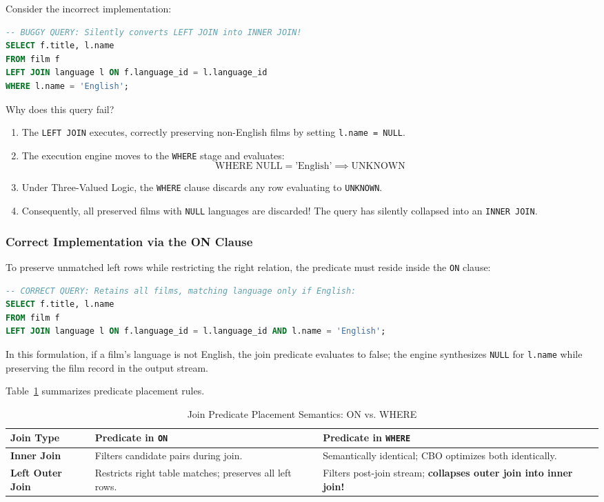 \documentclass[10pt,twocolumn,letterpaper]{article}
\begin{document}
Consider the incorrect implementation:
\begin{lstlisting}[language=SQL]
-- BUGGY QUERY: Silently converts LEFT JOIN into INNER JOIN!
SELECT f.title, l.name
FROM film f
LEFT JOIN language l ON f.language_id = l.language_id
WHERE l.name = 'English';
\end{lstlisting}
Why does this query fail?
\begin{enumerate}
    \item The \texttt{LEFT JOIN} executes, correctly preserving non-English films by setting \texttt{l.name = NULL}.
    \item The execution engine moves to the \texttt{WHERE} stage and evaluates:
    \begin{equation*}
    \text{WHERE } \text{NULL} = \text{'English'} \implies \text{UNKNOWN}
    \end{equation*}
    \item Under Three-Valued Logic, the \texttt{WHERE} clause discards any row evaluating to \texttt{UNKNOWN}.
    \item Consequently, all preserved films with \texttt{NULL} languages are discarded! The query has silently collapsed into an \texttt{INNER JOIN}.
\end{enumerate}

\subsubsection{Correct Implementation via the ON Clause}
To preserve unmatched left rows while restricting the right relation, the predicate must reside inside the \texttt{ON} clause:
\begin{lstlisting}[language=SQL]
-- CORRECT QUERY: Retains all films, matching language only if English:
SELECT f.title, l.name
FROM film f
LEFT JOIN language l ON f.language_id = l.language_id AND l.name = 'English';
\end{lstlisting}
In this formulation, if a film's language is not English, the join predicate evaluates to false; the engine synthesizes \texttt{NULL} for \texttt{l.name} while preserving the film record in the output stream.

Table~\ref{tab:on_vs_where} summarizes predicate placement rules.

\begin{table}[htbp]
\caption{Join Predicate Placement Semantics: ON vs. WHERE}
\label{tab:on_vs_where}
\centering
\scriptsize
\begin{tabular}{p{2.6cm}p{6.4cm}p{6.4cm}}
\toprule
\textbf{Join Type} & \textbf{Predicate in \texttt{ON}} & \textbf{Predicate in \texttt{WHERE}} \\
\midrule
\textbf{Inner Join} & Filters candidate pairs during join. & Semantically identical; CBO optimizes both identically. \\
\textbf{Left Outer Join} & Restricts right table matches; preserves all left rows. & Filters post-join stream; \textbf{collapses outer join into inner join!} \\
\bottomrule
\end{tabular}
\end{table}
\end{document}
